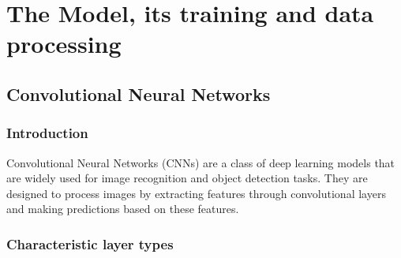 \documentclass[11pt,a4paper,oneside]{report}
\begin{document}

%


\selectthesislanguage



\tableofcontents\cleardoublepage





\chapter[Model, training and data]{The Model, its training and data processing} \label{part:model-training-data}
\section{Convolutional Neural Networks}\label{sec:convolutional-neural-networks}

\subsection{Introduction}\label{subsec:introduction}
Convolutional Neural Networks (CNNs) are a class of deep learning models that are widely used for
image recognition and object detection tasks.
They are designed to process images by extracting features through convolutional layers and
making predictions based on these features.

\subsection{Characteristic layer types}\label{subsec:characteristic-layer-types}
\end{document}
